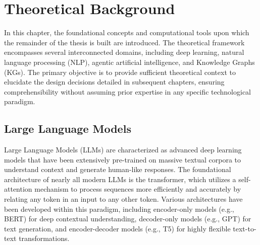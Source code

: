 ﻿\documentclass[11pt]{article}
\begin{document}
\section{Theoretical Background}
\label{sec:background}

In this chapter, the foundational concepts and computational tools upon which the remainder of the thesis is built are introduced. The theoretical framework encompasses several interconnected domains, including deep learning, natural language processing (NLP), agentic artificial intelligence, and Knowledge Graphs (KGs). The primary objective is to provide sufficient theoretical context to elucidate the design decisions detailed in subsequent chapters, ensuring comprehensibility without assuming prior expertise in any specific technological paradigm.

\subsection{Large Language Models}
\label{sec:bg_llm}

Large Language Models (LLMs) are characterized as advanced deep learning models that have been extensively pre-trained on massive textual corpora to understand context and generate human-like responses. The foundational architecture of nearly all modern LLMs is the transformer, which utilizes a self-attention mechanism to process sequences more efficiently and accurately by relating any token in an input to any other token. Various architectures have been developed within this paradigm, including encoder-only models (e.g., BERT) for deep contextual understanding, decoder-only models (e.g., GPT) for text generation, and encoder-decoder models (e.g., T5) for highly flexible text-to-text transformations.
\end{document}

